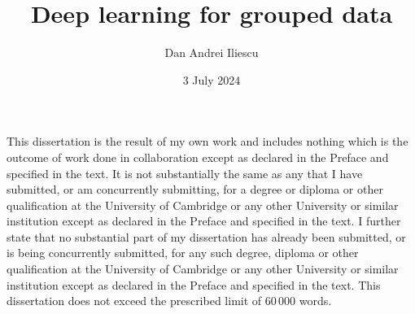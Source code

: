 \documentclass{article}
\title{\bf Deep learning for grouped data}
\author{Dan Andrei Iliescu}
\date{3 July 2024}
\begin{document}
\maketitle

This dissertation is the result of my own work and includes nothing which is the outcome
of work done in collaboration except as declared in the Preface and specified in the text.
It is not substantially the same as any that I have submitted, or am concurrently
submitting, for a degree or diploma or other qualification at the University of Cambridge
or any other University or similar institution except as declared in the Preface and
specified in the text. I further state that no substantial part of my dissertation has
already been submitted, or is being concurrently submitted, for any such degree, diploma
or other qualification at the University of Cambridge or any other University or similar
institution except as declared in the Preface and specified in the text.
This dissertation does not exceed the prescribed limit of 60\,000 words.
\end{document}
